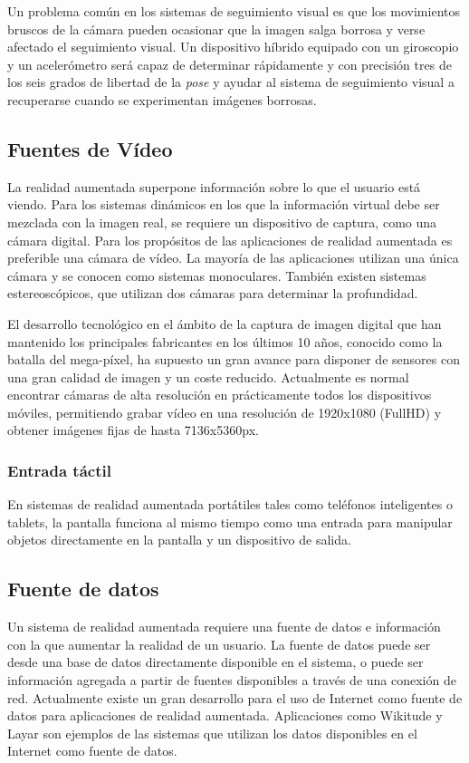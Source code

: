 Un problema común en los sistemas de seguimiento visual es que los movimientos bruscos de la cámara pueden ocasionar que la imagen salga borrosa y verse afectado el seguimiento visual. Un dispositivo híbrido equipado con un giroscopio y un acelerómetro será capaz de determinar rápidamente y con precisión tres de los seis grados de libertad de la \emph{pose} y ayudar al sistema de seguimiento visual a recuperarse cuando se experimentan imágenes borrosas. 

\subsection{Fuentes de Vídeo}
La realidad aumentada superpone información sobre lo que el usuario está viendo. Para los sistemas dinámicos en los que la información virtual debe ser mezclada con la imagen real, se requiere un dispositivo de captura, como una cámara digital. Para los propósitos de las aplicaciones de realidad aumentada es preferible una cámara de vídeo. La mayoría de las aplicaciones utilizan una única cámara y se conocen como sistemas monoculares. También existen sistemas estereoscópicos, que  utilizan dos cámaras para determinar la profundidad.

El desarrollo tecnológico en el ámbito de la captura de imagen digital que han mantenido los principales fabricantes en los últimos 10 años, conocido como la batalla del mega-píxel, ha supuesto un gran avance para disponer de sensores con una gran calidad de imagen y un coste reducido. Actualmente es normal encontrar cámaras de alta resolución en prácticamente todos los dispositivos móviles, permitiendo grabar vídeo en una resolución de 1920x1080 (FullHD) y obtener imágenes fijas de hasta 7136x5360px.

\subsubsection{Entrada táctil}
En sistemas de realidad aumentada portátiles tales como teléfonos inteligentes o tablets, la pantalla funciona al mismo tiempo como una entrada para manipular objetos directamente en la pantalla y un dispositivo de salida.

\subsection{Fuente de datos}
Un sistema de realidad aumentada requiere una fuente de datos e información con la que aumentar la realidad de un usuario. La fuente de datos puede ser desde una base de datos directamente disponible en el sistema, o puede ser información agregada a partir de fuentes disponibles a través de una conexión de red. Actualmente existe un gran desarrollo para el uso de Internet como fuente de datos para aplicaciones de realidad aumentada. Aplicaciones como Wikitude y Layar son ejemplos de las sistemas que utilizan los datos disponibles en el Internet como fuente de datos.


